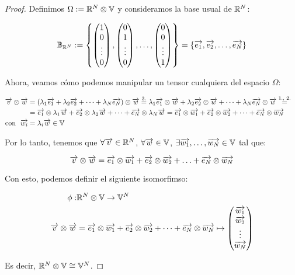 \begin{proof}
	Definimos $\Omega := \R^N \otimes \mathbb{V}$ y consideramos la base usual de $\R^N$:

	$$\mathbb{B}_{\R^N} := \left\{\vectorn{1}{0}{0}, \vectorn{0}{1}{0}, \ldots, \vectorn{0}{0}{1} \right\} = \left\{\nv{e_1}, \nv{e_2}, \ldots, \nv{e_N} \right\}$$

	Ahora, veamos cómo podemos manipular un tensor cualquiera del espacio $\Omega$:

	\begin{equation}
		\begin{split}
			\nv{v} \otimes \nv{w} &= (\lambda_1 \nv{e_1} + \lambda_2 \nv{e_2} + \cdots + \lambda_N \nv{e_N}) \otimes \nv{w} \eqtext{3.} \lambda_1 \nv{e_1} \otimes \nv{w} + \lambda_2 \nv{e_2} \otimes \nv{w} + \cdots + \lambda_N \nv{e_N} \otimes \nv{w} \eqtext{1., 2.} \\
			&= \nv{e_1} \otimes \lambda_1 \nv{w} + \nv{e_2} \otimes \lambda_2 \nv{w} + \cdots + \nv{e_N} \otimes \lambda_N \nv{w} = \nv{e_1} \otimes \nv{w_1} + \nv{e_2} \otimes \nv{w_2} + \dots + \nv{e_N} \otimes \nv{w_N} \qquad \\
			\text{con} \dspace \nv{w_i} &= \lambda_i \nv{w} \in \mathbb{V}
		\end{split}
	\end{equation}

	Por lo tanto, tenemos que $\forall \nv{v} \in \R^N$, $\forall \nv{w} \in \mathbb{V}$, $\exists \nv{w_1}, \ldots, \nv{w_N} \in \mathbb{V}$ tal que:

	$$\nv{v} \otimes \nv{w} = \nv{e_1} \otimes \nv{w_1} + \nv{e_2} \otimes \nv{w_2} + \ldots + \nv{e_N} \otimes \nv{w_N}$$

	Con esto, podemos definir el siguiente isomorfimso:

	\begin{equation}
		\begin{split}
			\phi: & \R^N \otimes \mathbb{V} \to \mathbb{V}^N \\
			\nv{v} \otimes \nv{w} &= \nv{e_1} \otimes \nv{w_1} + \nv{e_2} \otimes \nv{w_2} + \cdots + \nv{e_N} \otimes \nv{w_N} \mapsto \vectorn{\nv{w_1}}{\nv{w_2}}{\nv{w_N}}
		\end{split}
	\end{equation}

	Es decir, $\R^N \otimes \mathbb{V} \cong \mathbb{V}^N$.

\end{proof}

